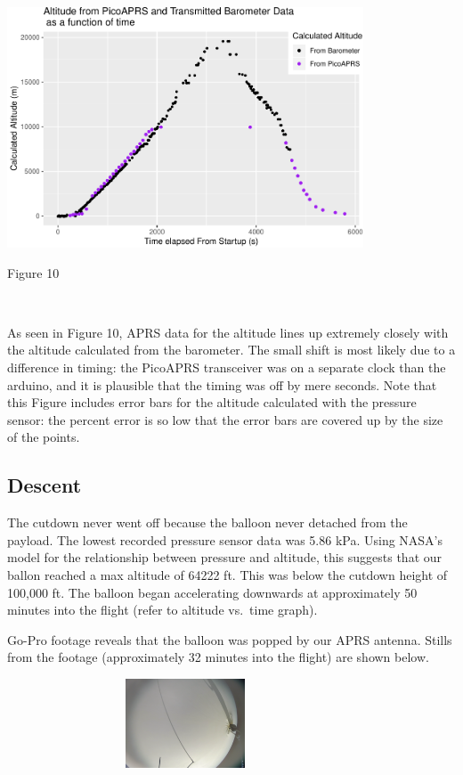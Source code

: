 \documentclass[12pt,]{article}
\begin{document}
\begin{center}\includegraphics[width=400px]{paper_files/figure-latex/altitude"-1} \end{center}

Figure 10

~

As seen in Figure 10, APRS data for the altitude lines up extremely
closely with the altitude calculated from the barometer. The small shift
is most likely due to a difference in timing: the PicoAPRS transceiver
was on a separate clock than the arduino, and it is plausible that the
timing was off by mere seconds. Note that this Figure includes error
bars for the altitude calculated with the pressure sensor: the percent
error is so low that the error bars are covered up by the size of the
points.

\subsection{Descent}\label{descent}

The cutdown never went off because the balloon never detached from the
payload. The lowest recorded pressure sensor data was 5.86 kPa. Using
NASA's model for the relationship between pressure and altitude, this
suggests that our ballon reached a max altitude of 64222 ft. This was
below the cutdown height of 100,000 ft. The balloon began accelerating
downwards at approximately 50 minutes into the flight (refer to altitude
vs.~time graph).

Go-Pro footage reveals that the balloon was popped by our APRS antenna.
Stills from the footage (approximately 32 minutes into the flight) are
shown below.

\begin{center}\includegraphics[width=400px,height=100px]{assets/IMAGEBREAKA} \end{center}
\end{document}

